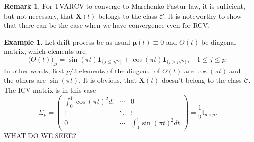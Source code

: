 \documentclass[a4paper,11pt]{book}
\theoremstyle{plain}
\theoremstyle{definition}
\newtheorem{exmp}[thm]{Example}
\newtheorem{rmrk}[thm]{Remark}
\begin{document}
    \begin{rmrk}
    	For TVARCV to converge to Marchenko-Pastur law, it is sufficient, but not necessary, that $\mathbf{X}(t)$ belongs to the class $\mathcal{C}$. It is noteworthy to show that there can be the case when we have convergence even for RCV.
    \end{rmrk}
    \begin{exmp} \label{counter exmpl}
    	Let drift process be as usual $\boldsymbol{\mu}(t) \equiv 0$ and $\Theta(t)$ be diagonal matrix, which elements are:
    	\[ \Big(\Theta(t)\Big)_{jj} = \sin(\pi t) \mathbf{1}_{\{j \leq p/2\}} + \cos(\pi t) \mathbf{1}_{\{j > p/2\}}, \quad 1 \leq j \leq p.  \]
    	In other words, first $p/2$ elements of the diagonal of $\Theta(t)$ are $\cos(\pi t)$ and the others are $\sin(\pi t)$. It is obvious, that $\mathbf{X}(t)$ doesn't belong to the class $\mathcal{C}$. The ICV matrix is in this case
    	\[ \Sigma_p = \begin{pmatrix}
    	\int_{0}^{1} \cos(\pi t)^2 dt & \cdots & 0 \\
    	\vdots & \ddots & \vdots \\
    	0 & \cdots & \int_{0}^{1} \sin(\pi t)^2 dt
    	\end{pmatrix} 
    	= \frac{1}{2} \mathbb{I}_{p \times p}. \]
    	WHAT DO WE SEEE?
    \end{exmp}
    
\end{document}
